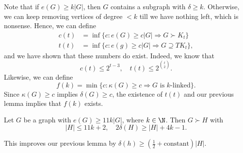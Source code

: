 \documentclass[a4paper]{article}
\begin{document}
Note that if $e(G) \geq k|G|$, then $G$ contains a subgraph with $\delta \geq k$. Otherwise, we can keep removing vertices of degree $<k$ till we have nothing left, which is nonsense. Hence, we can define
\begin{align*}
  c(t) &= \inf \{c: e(G) \geq c|G| \Rightarrow G \succ K_t\}\\
  t(t) &= \inf \{c: e(g) \geq c|G| \Rightarrow G \supseteq T K_t\},
\end{align*}
and we have shown that these numbers do exist. Indeed, we know that
\[
  c(t) \leq 2^{t - 3},\quad t(t) \leq 2^{\binom{t}{2}}.
\]
Likewise, we can define
\[
  f(k) = \min \{c: \kappa(G) \geq c \Rightarrow G \text{ is $k$-linked}\}.
\]
Since $\kappa(G) \geq c$ implies $\delta(G) \geq c$, the existence of $t(t)$ and our previous lemma implies that $f(k)$ exists.

\begin{lemma}
  Let $G$ be a graph with $e(G) \geq 11 k |G|$, where $k \in \N$. Then $G \succ H$ with
  \[
    |H| \leq 11k + 2,\quad 2\delta (H) \geq |H| + 4k - 1.
  \]
\end{lemma}
This improves our previous lemma by $\delta(h) \geq \left(\frac{1}{2} + \text{constant}\right) |H|$.
\end{document}
